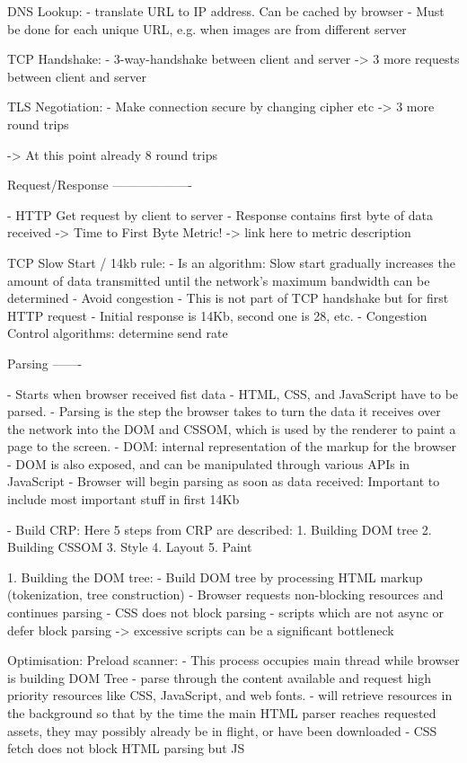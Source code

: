 DNS Lookup:
- translate URL to IP address. Can be cached by browser
- Must be done for each unique URL, e.g. when images are from different server

TCP Handshake:
- 3-way-handshake between client and server
-> 3 more requests between client and server

TLS Negotiation:
- Make connection secure by changing cipher etc
-> 3 more round trips


-> At this point already 8 round trips


Request/Response
-------------------

- HTTP Get request by client to server
- Response contains first byte of data received -> Time to First Byte Metric! -> link here to metric description

TCP Slow Start / 14kb rule:
- Is an algorithm: Slow start gradually increases the amount of data transmitted until the network's maximum bandwidth can be determined
- Avoid congestion
- This is not part of TCP handshake but for first HTTP request
- Initial response is 14Kb, second one is 28, etc.
- Congestion Control algorithms: determine send rate


Parsing
-------

- Starts when browser received fist data
- HTML, CSS, and JavaScript have to be parsed.
- Parsing is the step the browser takes to turn the data it receives over the network into the DOM and CSSOM, which is used by the renderer to paint a page to the screen.
- DOM: internal representation of the markup for the browser
- DOM is also exposed, and can be manipulated through various APIs in JavaScript
- Browser will begin parsing as soon as data received: Important to include most important stuff in first 14Kb


- Build CRP: Here 5 steps from CRP are described:
1. Building DOM tree
2. Building CSSOM
3. Style
4. Layout
5. Paint

1. Building the DOM tree:
- Build DOM tree by processing HTML markup (tokenization, tree construction)
- Browser requests non-blocking resources and continues parsing
- CSS does not block parsing
- scripts which are not async or defer block parsing -> excessive scripts can be a significant bottleneck

Optimisation: Preload scanner:
- This process occupies main thread while browser is building DOM Tree
- parse through the content available and request high priority resources like CSS, JavaScript, and web fonts.
- will retrieve resources in the background so that by the time the main HTML parser reaches requested assets, they may possibly already be in flight, or have been downloaded
- CSS fetch does not block HTML parsing but JS

